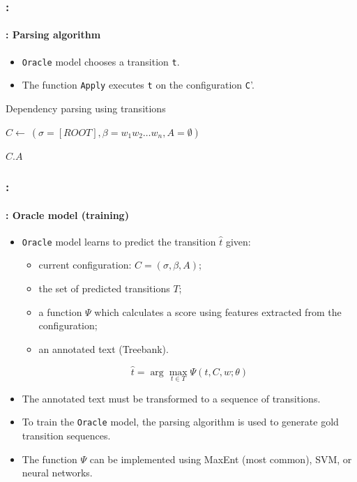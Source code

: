 \documentclass[xcolor=table]{beamer}
\begin{document}
\begin{frame}
	\frametitle{\insertshortsubtitle: \insertsection}
	\framesubtitle{\insertsubsection: Parsing algorithm}

	\begin{itemize}
		\item \texttt{Oracle} model chooses a transition \texttt{t}.
		\item The function \texttt{Apply} executes \texttt{t} on the configuration \texttt{C}'.
	\end{itemize}
	
	\begin{block}{Dependency parsing using transitions}
		\begin{algorithm}[H]
			
			$C \leftarrow\ (\sigma=[ROOT], \beta = w_1 w_2 \ldots w_n, A = \emptyset)$\;
			
			
		
			\Return $C.A$ \;
		\end{algorithm}
	\end{block}

\end{frame}

\begin{frame}
	\frametitle{\insertshortsubtitle: \insertsection}
	\framesubtitle{\insertsubsection: Oracle model (training)}

	\begin{itemize}
		\item \texttt{Oracle} model learns to predict the transition $\hat{t}$ given:
		\begin{itemize}
			\item current configuration: $ C = (\sigma, \beta, A) $;
			\item the set of predicted transitions $T$;
			\item a function $\Psi$ which calculates a score using features extracted from the configuration;
			\item an annotated text (Treebank).
		\end{itemize}
		\[ \hat{t} = \arg\max\limits_{t \in T} \Psi(t, C, w; \theta) \]
	
		\item The annotated text must be transformed to a sequence of transitions.
		\item To train the \texttt{Oracle} model, the parsing algorithm is used to generate gold transition sequences.
		\item The function $\Psi$ can be implemented using MaxEnt (most common), SVM, or neural networks.
	\end{itemize}

\end{frame}
\end{document}
